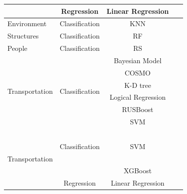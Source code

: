 \documentclass[a4paper,12pt,twoside]{ThesisStyle}
\begin{document}
\begin{longtable}{  l  c  c  l  }
 \cline{2-4} 
 & Regression  & Linear Regression & ~\cite{leiria2021using} \\
 \hline
\multirow{1}{*}{Environment} & \multirow{1}{*}{Classification}  & KNN & ~\cite{hangan2022advanced} \\
\hline
Structures & Classification  & RF & ~\cite{Zinno2022bridges} \\
\hline
People & Classification & RS & ~\cite{embarak2021new} \\
\hline
\multirow{6}{*}{Transportation} & \multirow{6}{*}{Classification}  & Bayesian Model & ~\cite{vidovic2022methodology}  \\
\cline{3-4} 
 & & COSMO & ~\cite{killeen2019iot}  \\
 \cline{3-4} 
 & & K-D tree & ~\cite{masino2017learning} \\
  \cline{3-4} 
 &  & Logical Regression & ~\cite{Wang2017Taxis} \\
 \cline{3-4} 
 & & RUSBoost & ~\cite{kyriakou2021vehicles} \\
 \cline{3-4} 
 & & \multirow{1}{*}{SVM} & ~\cite{Wang2017Taxis} \\
 \multirow{5}{*}{Transportation} & \multirow{3}{*}{Classification} & \multirow{3}{*}{SVM} & ~\cite{zantalis2019review} \\
 & & & ~\cite{sara2020predict} \\
 & & & ~\cite{Nugraha2021rail} \\
 \cline{3-4} 
 & & XGBoost & ~\cite{Wang2021CAN} \\
 \cline{2-4} 
 & \multirow{1}{*}{Regression} & Linear Regression & ~\cite{mondal2020road} \\
\end{longtable}
\end{document}
